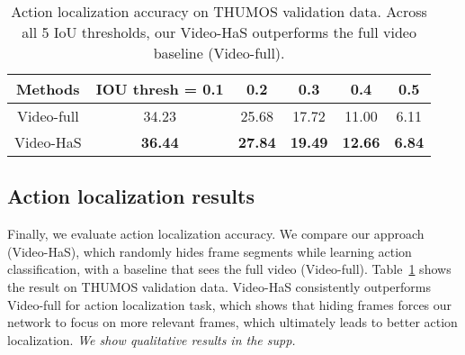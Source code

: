 \begin{table}[t!]
              \begin{center}
                  \footnotesize
                  \begin{tabular}{| c | c | c| c| c| c|}
                  \hline    	
	                Methods     & IOU thresh = 0.1 & 0.2 & 0.3 & 0.4 & 0.5 \\
	                \hline
					Video-full & 34.23 &   25.68 &   17.72   & 11.00 &   6.11\\
					Video-HaS & \textbf{36.44}   & \textbf{27.84} &   \textbf{19.49} &   \textbf{12.66}  &  \textbf{6.84}\\
					 \hline
					                   \end{tabular}

      \caption{Action localization accuracy on THUMOS validation data.   Across all 5 IoU thresholds, our Video-HaS outperforms the full video baseline (Video-full).}
                          \label{table:frame_hide}
                          \end{center}
                          \vspace*{-0.2in}
                          \end{table}
                          					
\subsection{Action localization results}

Finally, we evaluate action localization accuracy.  We compare our approach (Video-HaS), which randomly hides frame segments while learning action classification, with a baseline that sees the full video (Video-full).  Table~\ref{table:frame_hide} shows the result on THUMOS validation data.  Video-HaS consistently outperforms Video-full for action localization task, which shows that hiding frames forces our network to focus on more relevant frames, which ultimately leads to better action localization.  \emph{We show qualitative results in the supp.}

